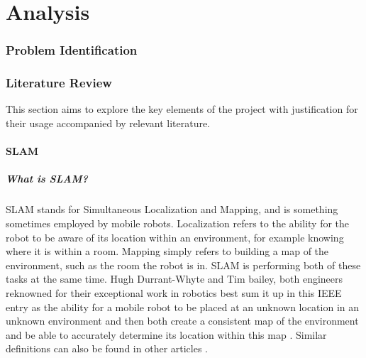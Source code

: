 \part{Analysis}
		\section{Problem Identification}
		\section{Literature Review}
			This section aims to explore the key elements of the project with justification for their usage accompanied by relevant literature.
			
			\subsection{SLAM}
				\subsubsection{What is SLAM?}
				SLAM stands for Simultaneous Localization and Mapping, and is something sometimes employed by mobile robots. Localization refers to the ability for the robot to be aware of its location within an environment, for example knowing where it is within a room. Mapping simply refers to building a map of the environment, such as the room the robot is in. SLAM is performing both of these tasks at the same time. Hugh Durrant-Whyte and Tim bailey, both engineers reknowned for their exceptional work in robotics best sum it up in this IEEE entry as the ability for a mobile robot to be placed at an unknown location in an unknown environment and then both create a consistent map of the environment and be able to accurately determine its location within this map \citep{durrant2006simultaneous}. Similar definitions can also be found in other articles \citep{choset2001topological, dissanayake2001solution}.
			

